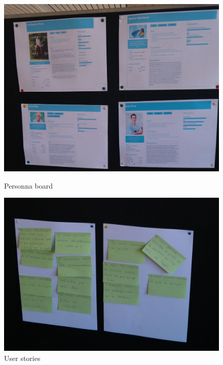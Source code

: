 \documentclass[t, 12pt, usenames,dvipsnames]{article}
\begin{document}
\begin{center}
                    \begin{figure}[!htb]
                            \includegraphics[width=\linewidth]{images/sprint/personas.jpg}
                            \caption{Personna board}\label{fig:board_user_personnas}
                        \endminipage
                        \hfill
                            \includegraphics[width=\linewidth]{images/sprint/user-stories.jpg}
                            \caption{User stories}\label{fig:board_user_stories}
                        \endminipage
                    \end{figure}
            \end{center}                
\end{document}
